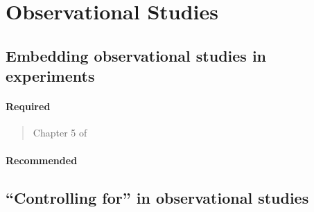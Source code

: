 \documentclass[12pt]{article}
\begin{document}
\begin{verse}  \end{verse}

\begin{verse}  \end{verse}

\begin{verse}  \end{verse}

\begin{verse}  \end{verse}


\begin{verse}  \end{verse}


\section{Observational Studies}

\subsection{Embedding observational studies in experiments}

\paragraph*{Required}

\begin{verse} Chapter 5 of  \end{verse}

\paragraph*{Recommended}

\begin{verse}  \end{verse}

\begin{verse}  \end{verse}

\subsection{``Controlling for'' in observational studies}
\end{document}
